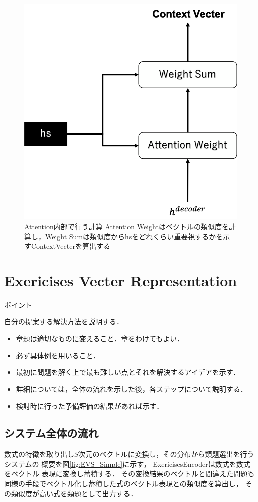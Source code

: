 \documentclass[a4j,11pt,report]{jsbook}
\newcommand{\point}[1]{
\begin{itembox}[l]{ポイント}
  #1
\end{itembox}
}
\begin{document}
\begin{center}
  \begin{figure}[ht]
    \centering
    \includegraphics[width=0.5\linewidth]{image/attention_layer.png}
    \caption{Attention内部で行う計算  Attention Weightはベクトルの類似度を計算し，Weight Sumは類似度からhsをどれくらい重要視するかを示すContextVecterを算出する}
    \label{fig:Attention_layer}
  \end{figure}
\end{center}
\fi


\chapter{Exericises Vecter Representation\label{ch:method}}
\point{
自分の提案する解決方法を説明する．
\begin{itemize}
  \item 章題は適切なものに変えること．章をわけてもよい．
  \item 必ず具体例を用いること．
  \item 最初に問題を解く上で最も難しい点とそれを解決するアイデアを示す．
  \item 詳細については，全体の流れを示した後，各ステップについて説明する．
  \item 検討時に行った予備評価の結果があれば示す．
\end{itemize}
}
\fi

\section{システム全体の流れ}

数式の特徴を取り出し$S$次元のベクトルに変換し，その分布から類題選出を行うシステムの
概要を図\ref{fig:EVS_Simple}に示す，
ExericisesEncoderは数式を数式をベクトル 表現に変換し蓄積する．
その変換結果のベクトルと間違えた問題も同様の手段でベクトル化し蓄積した式のベクトル表現との類似度を算出し，
その類似度が高い式を類題として出力する．
\end{document}
